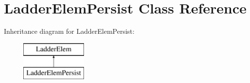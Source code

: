\hypertarget{class_ladder_elem_persist}{\section{Ladder\-Elem\-Persist Class Reference}
\label{class_ladder_elem_persist}
}
Inheritance diagram for Ladder\-Elem\-Persist\-:\begin{figure}[H]
\begin{center}
\leavevmode
\includegraphics[height=2.000000cm]{class_ladder_elem_persist}
\end{center}
\end{figure}
